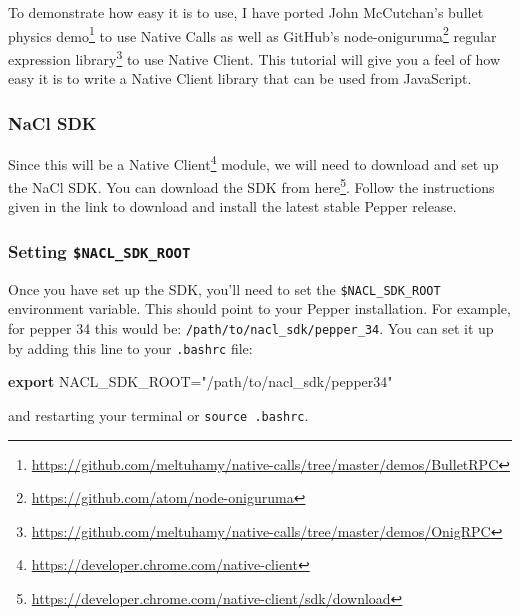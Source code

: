 \documentclass[]{article}
\newenvironment{Shaded}{}{}
\newcommand{\KeywordTok}[1]{\textcolor[rgb]{0.00,0.44,0.13}{\textbf{{#1}}}}
\newcommand{\StringTok}[1]{\textcolor[rgb]{0.25,0.44,0.63}{{#1}}}
\newcommand{\OtherTok}[1]{\textcolor[rgb]{0.00,0.44,0.13}{{#1}}}
\begin{document}
To demonstrate how easy it is to use, I have ported John McCutchan's bullet
physics demo\footnote{\url{https://github.com/meltuhamy/native-calls/tree/master/demos/BulletRPC}} to use Native Calls as well as
GitHub's node-oniguruma\footnote{\url{https://github.com/atom/node-oniguruma}}
 regular expression library\footnote{\url{https://github.com/meltuhamy/native-calls/tree/master/demos/OnigRPC}} to use Native Client. This tutorial will give you a
feel of how easy it is to write a Native Client library that can be used
from JavaScript.


\subsubsection{NaCl SDK}\label{nacl-sdk}

Since this will be a
Native Client\footnote{\url{https://developer.chrome.com/native-client}} module,
we will need to download and set up the NaCl SDK. You can download the
SDK from
here\footnote{\url{https://developer.chrome.com/native-client/sdk/download}}.
Follow the instructions given in the link to download and install the
latest stable Pepper release.

\subsubsection{Setting
\texttt{\$NACL\_SDK\_ROOT}}\label{setting-naclux5fsdkux5froot}

Once you have set up the SDK, you'll need to set the
\texttt{\$NACL\_SDK\_ROOT} environment variable. This should point to
your Pepper installation. For example, for pepper 34 this would be:
\texttt{/path/to/nacl\_sdk/pepper\_34}. You can set it up by adding this
line to your \texttt{.bashrc} file:

\begin{Shaded}
\begin{Highlighting}[]
\KeywordTok{export} \OtherTok{NACL_SDK_ROOT=}\StringTok{"/path/to/nacl_sdk/pepper34"}
\end{Highlighting}
\end{Shaded}

and restarting your terminal or \texttt{source .bashrc}.
\end{document}
